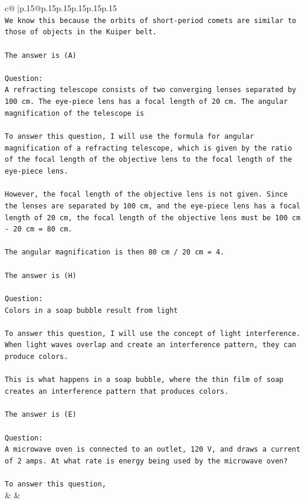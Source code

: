 \documentclass{article}
\begin{document}
{\begin{supertabular}{c@{$\;$}|p{.15\linewidth}@{}p{.15\linewidth}p{.15\linewidth}p{.15\linewidth}p{.15\linewidth}p{.15\linewidth}}
{{{\\ 
\texttt{We know this because the orbits of short{-}period comets are similar to those of objects in the Kuiper belt.} \\
\\ 
\texttt{The answer is (A)} \\
\\ 
\texttt{Question:} \\
\texttt{A refracting telescope consists of two converging lenses separated by 100 cm. The eye{-}piece lens has a focal length of 20 cm. The angular magnification of the telescope is} \\
\\ 
\texttt{To answer this question, I will use the formula for angular magnification of a refracting telescope, which is given by the ratio of the focal length of the objective lens to the focal length of the eye{-}piece lens.} \\
\\ 
\texttt{However, the focal length of the objective lens is not given. Since the lenses are separated by 100 cm, and the eye{-}piece lens has a focal length of 20 cm, the focal length of the objective lens must be 100 cm {-} 20 cm = 80 cm.} \\
\\ 
\texttt{The angular magnification is then 80 cm / 20 cm = 4.} \\
\\ 
\texttt{The answer is (H)} \\
\\ 
\texttt{Question:} \\
\texttt{Colors in a soap bubble result from light} \\
\\ 
\texttt{To answer this question, I will use the concept of light interference. When light waves overlap and create an interference pattern, they can produce colors.} \\
\\ 
\texttt{This is what happens in a soap bubble, where the thin film of soap creates an interference pattern that produces colors.} \\
\\ 
\texttt{The answer is (E)} \\
\\ 
\texttt{Question:} \\
\texttt{A microwave oven is connected to an outlet, 120 V, and draws a current of 2 amps. At what rate is energy being used by the microwave oven?} \\
\\ 
\texttt{To answer this question,} \\
            }
        }
    }
    & & \\ \\


\end{supertabular}}
\end{document}

